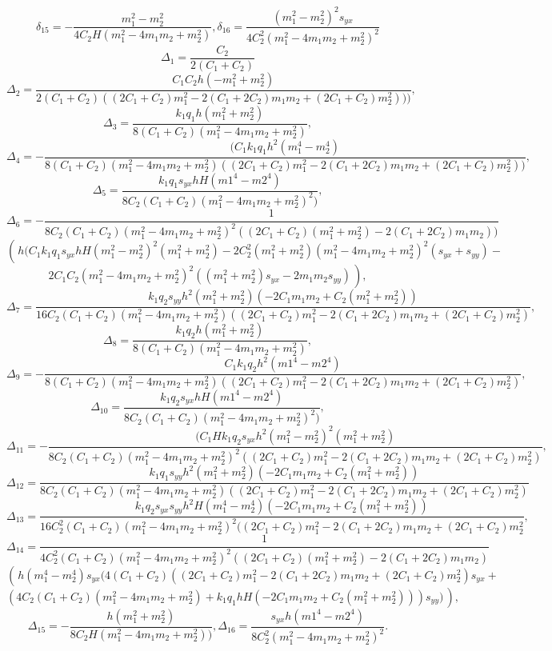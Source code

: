 \begin{small}
\[\delta_{15}=-\frac{m_1^2 - m_2^2}{4 C_2 H (m_1^2 - 4 m_1 m_2 + m_2^2)}
,
\delta_{16}=\frac{(m_1^2 - m_2^2)^2 s_{yx}}{4 C_2^2 (m_1^2 - 4 m_1 m_2 + m_2^2)^2}
\]
\[
\Delta_1=\frac{C_2}{2 (C_1 + C_2)}
\]
\[
\Delta_2=\frac{C_1 C_2 h (-m_1^2 + m_2^2)}{
	2 (C_1 + C_2) ((2 C_1 + C_2) m_1^2 - 
	2 (C_1 + 2 C_2) m_1 m_2 + (2 C_1 + C_2) m_2^2)))},
\]
\[
\Delta_3=\frac{k_1 q_1 h (m_1^2 + m_2^2) }{8 (C_1 + C_2) (m_1^2 - 4 m_1 m_2 + m_2^2)},
\]
\[
\Delta_4=-\frac{(C_1 k_1  q_1  h^2(m_1^4 - m_2^4) }{
	8 (C_1 + C_2) (m_1^2 - 4 m_1 m_2 + m_2^2) ((2 C_1 + C_2) m_1^2 - 
	2 (C_1 + 2 C_2) m_1 m_2 + (2 C_1 + C_2) m_2^2))},
\]
\[
\Delta_5=\frac{ k_1 q_1 s_{yx} h H (m1^4 - m2^4) }{
	8 C_2 (C_1 + C_2) (m_1^2 - 4 m_1 m_2 + m_2^2)^2)},
\]
\[
\Delta_6=-\frac{1}{8 C_2 (C_1 + C_2) (m_1^2 - 4 m_1 m_2 + 
	m_2^2)^2 ((2 C_1 + C_2) (m_1^2+ m_2^2) - 
	2 (C_1 + 2 C_2) m_1 m_2 ))}
\]
\[
\left(\frac{}{}h (C_1  k_1  q_1 s_{yx} h H (m_1^2 - m_2^2)^2 (m_1^2 + m_2^2) - 
2 C_2^2 (m_1^2 + m_2^2) (m_1^2 - 4 m_1 m_2 + m_2^2)^2 (s_{yx} + s_{yy}) -\right.
\]
\[ 
\left.  2 C_1 C_2 (m_1^2 - 4 m_1 m_2 + m_2^2)^2 ((m_1^2 + m_2^2) s_{yx} - 
2 m_1 m_2 s_{yy})\frac{}{}\right)          ,
\]
\[
\Delta_7=\frac{ k_1 q_2 s_{yy} h^2 (m_1^2 + m_2^2) (-2 C_1 m_1 m_2 + 
	C_2 (m_1^2 + m_2^2)) }{16 C_2 (C_1 + C_2) (m_1^2 - 4 m_1 m_2 + 
	m_2^2) ((2 C_1 + C_2) m_1^2 - 2 (C_1 + 2 C_2) m_1 m_2 + (2 C_1 + C_2) m_2^2)},
\]
\[
\Delta_8=\frac{k_1 q_2 h (m_1^2 + m_2^2) }{8 (C_1 + C_2) (m_1^2 - 4 m_1 m_2 + m_2^2)},
\]
\[
\Delta_9=-\frac{C_1  k_1 q_2 h^2 (m1^4 - m2^4) }{
	8 (C_1 + C_2) (m_1^2 - 4 m_1 m_2 + m_2^2) ((2 C_1 + C_2) m_1^2 - 
	2 (C_1 + 2 C_2) m_1 m_2 + (2 C_1 + C_2) m_2^2)},
\]
\[
\Delta_{10}=\frac{k_1 q_2 s_{yx}h H  (m1^4 - m2^4) }{
	8 C_2 (C_1 + C_2) (m_1^2 - 4 m_1 m_2 + m_2^2)^2)},
\]
\[
\Delta_{11}=-\frac{(C_1 H k_1  q_2 s_{yx}  h^2 (m_1^2 - m_2^2)^2 (m_1^2 + m_2^2)}{
	8 C_2 (C_1 + C_2) (m_1^2 - 4 m_1 m_2 + m_2^2)^2 ((2 C_1 + C_2) m_1^2 - 
	2 (C_1 + 2 C_2) m_1 m_2 + (2 C_1 + C_2) m_2^2)},
\]
\[
\Delta_{12}=\frac{k_1 q_1 s_{yy} h^2  (m_1^2 + m_2^2) (-2 C_1 m_1 m_2 + 
	C_2 (m_1^2 + m_2^2))}{8 C_2 (C_1 + C_2) (m_1^2 - 4 m_1 m_2 + 
	m_2^2) ((2 C_1 + C_2) m_1^2 - 2 (C_1 + 2 C_2) m_1 m_2 + (2 C_1 + C_2) m_2^2)}
\]
\[
\Delta_{13}=\frac{ k_1 q_2 s_{yx} s_{yy} h^2 H (m_1^4 - m_2^4) (-2 C_1 m_1 m_2 + 
	C_2 (m_1^2 + m_2^2))}{16 C_2^2 (C_1 + C_2) (m_1^2 - 4 m_1 m_2 + 
	m_2^2)^2 ((2 C_1 + C_2) m_1^2 - 2 (C_1 + 2 C_2) m_1 m_2 + (2 C_1 + C_2) m_2^2},
\]
\[
\Delta_{14}=\frac{1} {4 C_2^2 (C_1 + C_2) (m_1^2 - 
	4 m_1 m_2 + m_2^2)^2 ((2 C_1 + C_2) (m_1^2+m_2^2) - 
	2 (C_1 + 2 C_2) m_1 m_2 )}
\]
\[ \left(\frac{}{} h (m_1^4 - 
m_2^4) s_{yx} (4 (C_1 + C_2) ((2 C_1 + C_2) m_1^2 - 
2 (C_1 + 2 C_2) m_1 m_2 + (2 C_1 + C_2) m_2^2) s_{yx} + \right.
\]
\[
\left.(4 C_2 (C_1 + 
C_2) (m_1^2 - 4 m_1 m_2 + m_2^2) + 
k_1 q_1  h H (-2 C_1 m_1 m_2 + 
C_2 (m_1^2 + m_2^2)) ) s_{yy})\frac{}{}\right) ,
\]
\[
\Delta_{15}=-\frac{h (m_1^2 + m_2^2)}{8 C_2 H (m_1^2 - 4 m_1 m_2 + m_2^2))},
\Delta_{16}=\frac{s_{yx} h (m1^4 - m2^4)}{8 C_2^2 (m_1^2 - 4 m_1 m_2 + m_2^2)^2}.
\]
\end{small}

